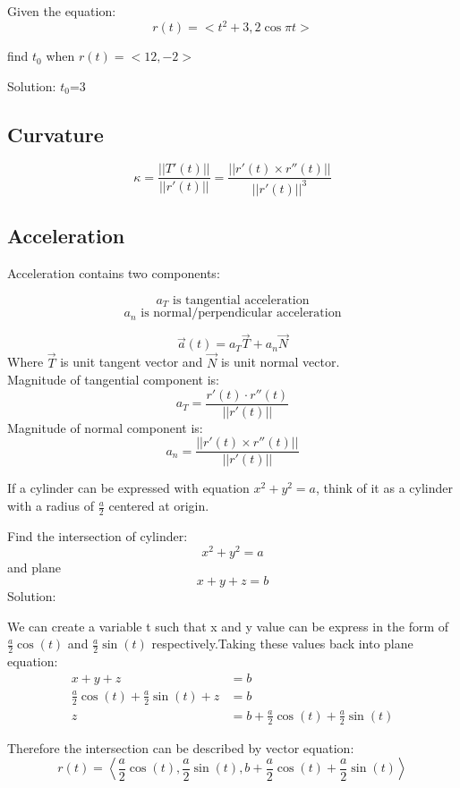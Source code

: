 \begin{simple}{}{}
Given the equation:
$$r(t)=<t^2+3, 2\cos{\pi t}>$$

find $t_0$ when $r(t)=<12, -2>$

Solution:
$t_0$=3
\end{simple}

\subsection{Curvature}
$$\kappa=\frac{||T'(t)||}{||r'(t)||}=\frac{||r'(t)\times r''(t)||}{||r'(t)||^3}$$

\subsection{Acceleration}
\begin{theorem}{}{}
Acceleration contains two components:
\begin{multicols}{2}
\noindent
$$a_T\text{ is tangential acceleration}$$
$$a_n\text{ is normal/perpendicular acceleration}$$
\end{multicols}
\begin{equation}
    \Vec{a}(t)=a_T\Vec{T}+a_n\Vec{N}
\end{equation}
Where $\Vec{T}$ is unit tangent vector and $\Vec{N}$ is unit normal vector.\\
Magnitude of tangential component is:
\begin{equation}
    a_T=\frac{r'(t)\cdot r''(t)}{||r'(t)||}
\end{equation}
Magnitude of normal component is:
\begin{equation}
    a_n=\frac{||r'(t)\times r''(t)||}{||r'(t)||}
\end{equation}
\end{theorem}

\begin{theorem}{}{}
If a cylinder can be expressed with equation $x^2+y^2=a$, think of it as a cylinder with a radius of $\frac{a}{2}$ centered at origin.
\end{theorem}

\begin{example}{}{}
Find the intersection of cylinder: $$x^2+y^2=a$$ and plane $$x+y+z=b$$
Solution:

We can create a variable t such that x and y value can be express in the form of $\frac{a}{2}\cos{(t)}$ and $\frac{a}{2}\sin{(t)}$ respectively.Taking these values back into plane equation:
\begin{align*}
    x+y+z&=b\\
    \frac{a}{2}\cos{(t)}+\frac{a}{2}\sin{(t)}+z&=b\\
    z&=b+\frac{a}{2}\cos{(t)}+\frac{a}{2}\sin{(t)}
\end{align*}

Therefore the intersection can be described by vector equation:
$$r(t)=\left<\frac{a}{2}\cos{(t)}, \frac{a}{2}\sin{(t)}, b+\frac{a}{2}\cos{(t)}+\frac{a}{2}\sin{(t)}\right>$$
\end{example}